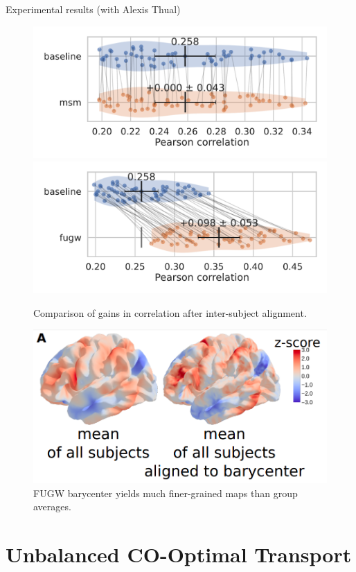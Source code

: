 \documentclass{beamer}
\begin{document}
\begin{frame}{Experimental results (with Alexis Thual)}

  \begin{figure}
    \centering
    \includegraphics[width=0.49\linewidth, keepaspectratio=true]{OT_new/fsaverage5_alignment_correlation_gain_msm.pdf}
    \includegraphics[width=0.49\linewidth, keepaspectratio=true]{OT_new/fsaverage5_alignment_correlation_gain_fugw.pdf}
    \caption*{\scriptsize{Comparison of gains in correlation after inter-subject alignment.}}
  \end{figure}

  \begin{figure}
    \centering
    \includegraphics[width=0.4\linewidth, keepaspectratio=true]{OT_new/brain_template.png}
    \caption*{\scriptsize{FUGW barycenter yields much finer-grained maps than group averages.}}
  \end{figure}
\end{frame}

\section{Unbalanced CO-Optimal Transport}
\end{document}
